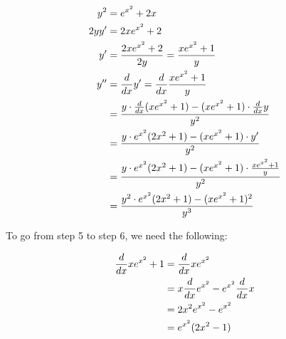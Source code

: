 \documentclass[12pt]{article} %
\begin{document}
\begin{homeworkProblem}

    \begin{align}
        y^2    & = e^{x^2} + 2x                                                                           \\
        2 y y' & = 2xe^{x^2} + 2                                                                          \\
        y '    & = \frac{2xe^{x^2} + 2}{2y} = \frac{xe^{x^2} + 1}{y}                                      \\
        y ''   & = \frac{d}{dx} y ' = \frac{d}{dx} \frac{xe^{x^2} + 1}{y}                                   \\
               & = \frac{y \cdot \frac{d}{dx} (xe^{x^2} + 1) - (xe^{x^2} + 1) \cdot \frac{d}{dx} y}{y ^ 2}  \\
               & = \frac{y \cdot e^{x^2} (2x^2 + 1) - (xe^{x^2} + 1) \cdot y '}{y ^ 2}                    \\
               & = \frac{y \cdot e^{x^2} (2x^2 + 1) - (xe^{x^2} + 1) \cdot \frac{xe^{x^2} + 1}{y}}{y ^ 2} \\
               & = \frac{y^2 \cdot e^{x^2} (2x^2 + 1) - (xe^{x^2} + 1)^2}{y ^ 3}
    \end{align}

    To go from step 5 to step 6, we need the following:

    \begin{align*}
        \frac{d}{dx} xe^{x^2} + 1
         & = \frac{d}{dx} xe^{x^2}                          \\
         & = x \frac{d}{dx} e^{x^2} - e^{x^2} \frac{d}{dx} x \\
         & = 2 x^2 e^{x^2} - e^{x^2}                       \\
         & = e^{x^2} (2x^2 - 1)
    \end{align*}

\end{homeworkProblem}
\pagebreak

\end{document}
